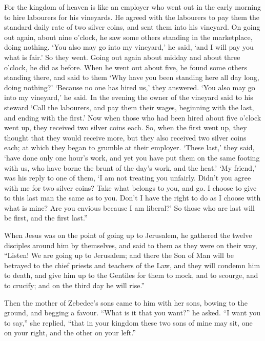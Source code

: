  For the kingdom of heaven is like an employer who went out
in the early morning to hire labourers for his vineyards. 
He agreed with the labourers to pay them the standard daily rate of two
silver coins, and sent them into his vineyard.  On going out
again, about nine o'clock, he saw some others standing in the
marketplace, doing nothing.  `You also may go into my
vineyard,' he said, `and I will pay you what is fair.'  So
they went. Going out again about midday and about three o'clock, he did
as before.  When he went out about five, he found some
others standing there, and said to them `Why have you been standing here
all day long, doing nothing?'  `Because no one has hired
us,' they answered. `You also may go into my vineyard,' he said.
 In the evening the owner of the vineyard said to his
steward `Call the labourers, and pay them their wages, beginning with
the last, and ending with the first.'  Now when those who
had been hired about five o'clock went up, they received two silver
coins each.  So, when the first went up, they thought that
they would receive more, but they also received two silver coins each;
 at which they began to grumble at their employer.
 `These last,' they said, `have done only one hour's work,
and yet you have put them on the same footing with us, who have borne
the brunt of the day's work, and the heat.'  `My friend,'
was his reply to one of them, `I am not treating you unfairly. Didn't
you agree with me for two silver coins?  Take what belongs
to you, and go. I choose to give to this last man the same as to you.
 Don't I have the right to do as I choose with what is
mine? Are you envious because I am liberal?'  So those who
are last will be first, and the first last.''

 When Jesus was on the point of going up to Jerusalem, he
gathered the twelve disciples around him by themselves, and said to them
as they were on their way,  ``Listen! We are going up to
Jerusalem; and there the Son of Man will be betrayed to the chief
priests and teachers of the Law, and they will condemn him to death,
 and give him up to the Gentiles for them to mock, and to
scourge, and to crucify; and on the third day he will rise.''

 Then the mother of Zebedee's sons came to him with her
sons, bowing to the ground, and begging a favour.  ``What
is it that you want?'' he asked. ``I want you to say,'' she replied,
``that in your kingdom these two sons of mine may sit, one on your
right, and the other on your left.''

